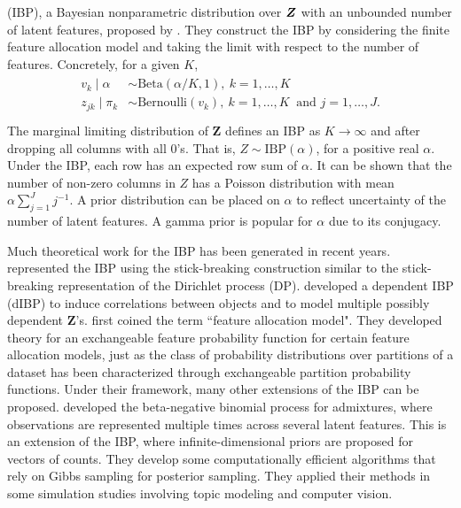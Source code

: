\documentclass[12pt,]{article}
\def\Z{\bm{Z}}
\newcommand{\bZ}{\mbox{\boldmath $Z$}}
\begin{document}
(IBP), a Bayesian nonparametric distribution over $\bZ$ with an unbounded
number of latent features, proposed by \citet{griffiths2011indian}.  They
construct the IBP by considering the finite feature allocation model and taking
the limit with respect to the number of features. Concretely, for a given
$K$,
\begin{align}
\begin{split}
v_k \mid \alpha &\sim \text{Beta}(\alpha/K, 1),~ k=1, \ldots, K \\
z_{jk} \mid \pi_k &\sim \text{Bernoulli}(v_k),~ k=1, \ldots, K~\mbox{ and }
j=1, \ldots, J. \\
\end{split}
\label{eq:ibp}
\end{align}
The marginal limiting distribution of $\Z$ defines an IBP as $K \rightarrow
\infty$ and after dropping all columns with all 0's. That is,  \(Z \sim
\text{IBP}(\alpha)\), for a positive real $\alpha$.  Under the IBP, each row
has an expected row sum of $\alpha$.  It can be shown that the number of
non-zero columns in $Z$ has a Poisson distribution with mean $\alpha
\sum_{j=1}^J j^{-1}$. A prior distribution can be placed on \(\alpha\) to
reflect uncertainty of the number of latent features. A gamma prior is popular
for $\alpha$ due to its conjugacy.

Much theoretical work for the IBP has been generated in recent years.
\cite{teh2007stick} represented the IBP using the stick-breaking construction
similar to the stick-breaking representation of the Dirichlet process (DP).
\cite{williamson2010dependent} developed a dependent IBP (dIBP) to induce
correlations between objects and to model multiple possibly dependent $\Z$'s.
\cite{broderick2015combinatorial} first coined the term ``feature allocation
model". They developed theory for an exchangeable feature probability function
for certain feature allocation models, just as the class of probability
distributions over partitions of a dataset has been characterized through
exchangeable partition probability functions. Under their framework, many other
extensions of the IBP can be proposed.  \cite{broderick2013feature} developed
the beta-negative binomial process for admixtures, where observations are
represented multiple times across several latent features. This is an
extension of the IBP, where infinite-dimensional priors are proposed for
vectors of counts. They develop some computationally efficient algorithms that
rely on Gibbs sampling for posterior sampling. They applied their methods in
some simulation studies involving topic modeling and computer vision.
\end{document}
